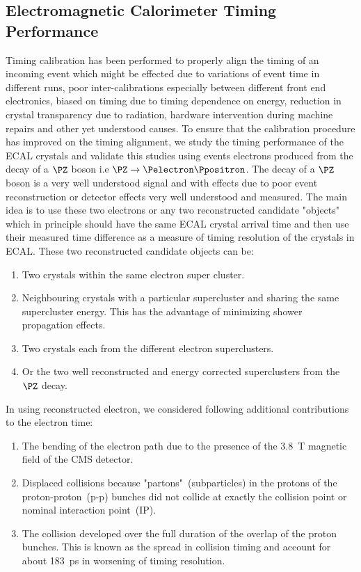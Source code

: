 \subsection{Electromagnetic Calorimeter Timing Performance}
Timing calibration has been performed to properly align the timing of an incoming event which might be effected due to variations of event time in different runs, poor inter-calibrations especially between different front end electronics, biased on timing due to timing dependence on energy, reduction in \pb crystal transparency due to radiation, hardware intervention during machine repairs and other yet understood causes. To ensure that the calibration procedure has improved on the timing alignment, we study the timing performance of the ECAL crystals and validate this studies using events electrons produced from the decay of a $\PZ$ boson  i.e $\PZ \rightarrow \Pelectron \Ppositron$.  The decay of a $\PZ$ boson is a very well understood signal and with effects due to poor event reconstruction or detector effects very well understood and measured. 
\newline
The main idea is to use these two electrons or any two reconstructed candidate "objects" which in principle should have the same ECAL crystal arrival time and then use their measured time difference as a measure of timing resolution of the \pb crystals in ECAL. These two reconstructed candidate objects can be:
\begin{enumerate}
\item Two crystals within the same electron super cluster.
\item Neighbouring crystals with a particular supercluster and sharing the same supercluster energy. This has the advantage of minimizing shower propagation effects.
\item Two crystals each from the different electron superclusters.
\item Or the two well reconstructed and energy corrected superclusters from the $\PZ$ decay. 
\end{enumerate}

In using reconstructed electron, we considered following additional contributions to the electron time:
\begin{enumerate}
\item The bending of the electron path due to the presence of the 3.8~T magnetic field of the CMS detector.
\item  Displaced collisions because "partons"~(subparticles) in the protons of the proton-proton~(p-p) bunches did not collide at exactly the collision point or nominal interaction point~(IP).
\item The collision developed over the full duration of the overlap of the proton bunches. This is known as the spread in collision timing and account for about 183~ps in worsening of timing resolution.
\end{enumerate}

